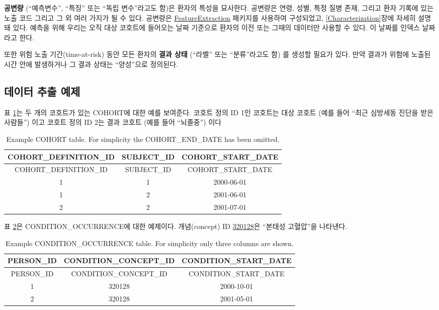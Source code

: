 \documentclass[11pt]{book}
\theoremstyle{definition}
\theoremstyle{definition}
\theoremstyle{definition}
\theoremstyle{remark}
\begin{document}
\textbf{공변량} (``예측변수'', ``특징'' 또는 ``독립 변수''라고도 함)은
환자의 특성을 묘사한다. 공변량은 연령, 성별, 특정 질병 존재, 그리고 환자
기록에 있는 노출 코드 그리고 그 외 여러 가지가 될 수 있다. 공변량은
\href{https://ohdsi.github.io/FeatureExtraction/}{FeatureExtraction}
패키지를 사용하여 구성되었고, \ref{Characterization}장에 자세히 설명돼
있다. 예측을 위해 우리는 오직 대상 코호트에 들어오는 날짜 기준으로
환자의 이전 또는 그때의 데이터만 사용할 수 있다. 이 날짜를 인덱스
날짜라고 한다.

또한 위험 노출 기간(time-at-risk) 동안 모든 환자의 \textbf{결과 상태}
(``라벨'' 또는 ``분류''라고도 함) 를 생성할 필요가 있다. 만약 결과가
위험에 노출된 시간 안에 발생하거나 그 결과 상태는 ``양성''으로
정의된다.  

\subsection{데이터 추출 예제}\label{--}

표 \ref{tab:plpExampleCohorts}는 두 개의 코호트가 있는 COHORT에 대한
예를 보여준다. 코호트 정의 ID 1인 코호트는 대상 코호트 (예를 들어 ``최근
심방세동 진단을 받은 사람들'') 이고 코호트 정의 ID 2는 결과 코호트 (예를
들어 ``뇌졸중'') 이다

\begin{longtable}[]{@{}ccc@{}}
\caption{\label{tab:plpExampleCohorts} Example COHORT table. For simplicity
the COHORT\_END\_DATE has been omitted.}\tabularnewline
\toprule
COHORT\_DEFINITION\_ID & SUBJECT\_ID &
COHORT\_START\_DATE\tabularnewline
\midrule
\endfirsthead
\toprule
COHORT\_DEFINITION\_ID & SUBJECT\_ID &
COHORT\_START\_DATE\tabularnewline
\midrule
\endhead
1 & 1 & 2000-06-01\tabularnewline
1 & 2 & 2001-06-01\tabularnewline
2 & 2 & 2001-07-01\tabularnewline
\bottomrule
\end{longtable}

표 \ref{tab:plpExampleConditions}은 CONDITION\_OCCURRENCE에 대한
예제이다. 개념(concept) ID
\href{http://athena.ohdsi.org/search-terms/terms/320128}{320128}은
``본태성 고혈압''을 나타낸다.

\begin{longtable}[]{@{}ccc@{}}
\caption{\label{tab:plpExampleConditions} Example CONDITION\_OCCURRENCE
table. For simplicity only three columns are shown.}\tabularnewline
\toprule
PERSON\_ID & CONDITION\_CONCEPT\_ID &
CONDITION\_START\_DATE\tabularnewline
\midrule
\endfirsthead
\toprule
PERSON\_ID & CONDITION\_CONCEPT\_ID &
CONDITION\_START\_DATE\tabularnewline
\midrule
\endhead
1 & 320128 & 2000-10-01\tabularnewline
2 & 320128 & 2001-05-01\tabularnewline
\bottomrule
\end{longtable}
\end{document}
